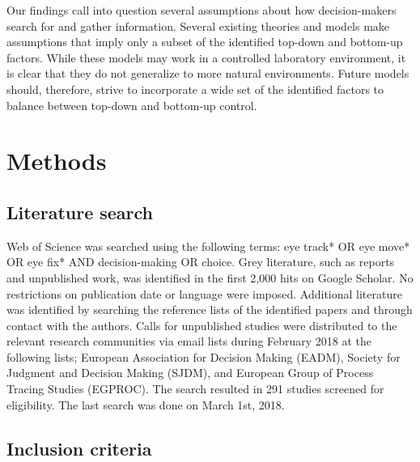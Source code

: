 \documentclass{article}
\begin{document}
Our findings call into question several assumptions about how decision-makers search for and gather information. Several existing theories and models make assumptions that imply only a subset of the identified top-down and bottom-up factors. While these models may work in a controlled laboratory environment, it is clear that they do not generalize to more natural environments. Future models should, therefore, strive to incorporate a wide set of the identified factors to balance between top-down and bottom-up control. 



\section{Methods}

\subsection{Literature search}

Web of Science was searched using the following terms: eye track* OR eye move* OR eye fix* AND decision-making OR choice. Grey literature, such as reports and unpublished work, was identified in the first 2,000 hits on Google Scholar. No restrictions on publication date or language were imposed. Additional literature was identified by searching the reference lists of the identified papers and through contact with the authors. Calls for unpublished studies were distributed to the relevant research communities via email lists during February 2018 at the following lists; European Association for Decision Making (EADM), Society for Judgment and Decision Making (SJDM), and European Group of Process Tracing Studies (EGPROC). The search resulted in 291 studies screened for eligibility. The last search was done on March 1st, 2018.


\subsection{Inclusion criteria}
\end{document}
